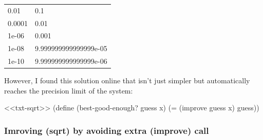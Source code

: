 \documentclass[
]{article}
\newenvironment{Shaded}{}{}
\newcommand{\ExtensionTok}[1]{#1}
\newcommand{\FunctionTok}[1]{\textcolor[rgb]{0.02,0.16,0.49}{#1}}
\newcommand{\NormalTok}[1]{#1}
\newcommand{\OperatorTok}[1]{\textcolor[rgb]{0.40,0.40,0.40}{#1}}
\begin{document}
\begin{longtable}[]{@{}ll@{}}
\toprule
\endhead
0.01 & 0.1 \\
0.0001 & 0.01 \\
1e-06 & 0.001 \\
1e-08 & 9.999999999999999e-05 \\
1e-10 & 9.999999999999999e-06 \\
\bottomrule
\end{longtable}

However, I found this solution online that isn't just simpler but
automatically reaches the precision limit of the system:

\hypertarget{new-good-enough}{%
\label{new-good-enough}}%
\begin{Shaded}
\begin{Highlighting}[numbers=left,,]
\NormalTok{\textless{}\textless{}txt{-}sqrt\textgreater{}\textgreater{}}
\NormalTok{(}\ExtensionTok{define}\FunctionTok{ }\NormalTok{(best{-}good{-}enough? guess x)}
\NormalTok{   (}\OperatorTok{=}\NormalTok{ (improve guess x) guess))}
\end{Highlighting}
\end{Shaded}

\hypertarget{imroving-sqrt-by-avoiding-extra-improve-call}{%
\subsubsection{Imroving (sqrt) by avoiding extra (improve)
call}\label{imroving-sqrt-by-avoiding-extra-improve-call}}
\end{document}
